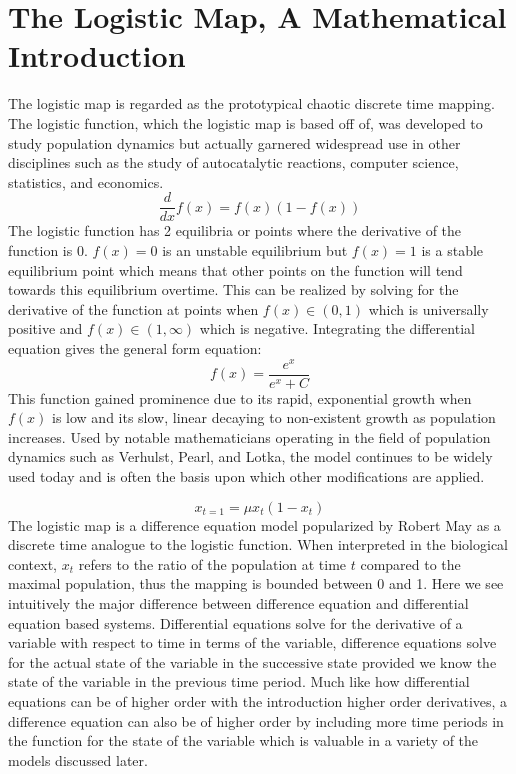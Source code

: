\section{The Logistic Map, A Mathematical Introduction}
The logistic map is regarded as the prototypical chaotic discrete time mapping. The logistic function, which the logistic map is based off of, was developed to study population dynamics but actually garnered widespread use in other disciplines such as the study of autocatalytic reactions, computer science, statistics, and economics\autocite{Kavanagh1934}.
\begin{equation}
    \frac{d}{dx}f(x)=f(x)(1-f(x))
\end{equation}
The logistic function has 2 equilibria or points where the derivative of the function is 0. $f(x) = 0$ is an unstable equilibrium but $f(x)=1$ is a stable equilibrium point which means that other points on the function will tend towards this equilibrium overtime.  This can be realized by solving for the derivative of the function at points when $f(x)\in(0,1)$ which is universally positive and $f(x)\in(1,\infty)$ which is negative. Integrating the differential equation gives the general form equation:
\begin{equation}
    f(x)=\frac{e^x}{e^x+C}
\end{equation}
This function gained prominence due to its rapid, exponential growth when $f(x)$ is low and its slow, linear decaying to non-existent growth as population increases.  Used by notable mathematicians operating in the field of population dynamics such as Verhulst, Pearl, and Lotka, the model continues to be widely used today and is often the basis upon which other modifications are applied\autocite{Zwanzig1973}.

\begin{equation}
    x_{t=1}=\mu x_t(1-x_t)
\end{equation}
The logistic map is a difference equation model popularized by Robert May as a discrete time analogue to the logistic function\autocite{May1976}. When interpreted in the biological context, $x_t$ refers to the ratio of the population at time $t$ compared to the maximal population, thus the mapping is bounded between 0 and 1. Here we see intuitively the major difference between difference equation and differential equation based systems. Differential equations solve for the derivative of a variable with respect to time in terms of the variable, difference equations solve for the actual state of the variable in the successive state provided we know the state of the variable in the previous time period. Much like how differential equations can be of higher order with the introduction higher order derivatives, a difference equation can also be of higher order by including more time periods in the function for the state of the variable which is valuable in a variety of the models discussed later.


